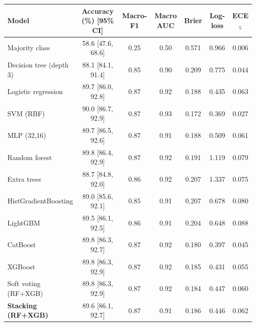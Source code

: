 \begin{tabular}{@{}lcccccc@{}}
\toprule
Model & Accuracy (\%) [95\% CI] & Macro-F1 & Macro AUC & Brier & Log-loss & ECE$_5$\\
\midrule
Majority class & 58.6 [47.6, 68.6] & 0.25 & 0.50 & 0.571 & 0.966 & 0.006\\\midrule
Decision tree (depth 3) & 88.1 [84.1, 91.4] & 0.85 & 0.90 & 0.209 & 0.775 & 0.044\\
Logistic regression & 89.7 [86.0, 92.8] & 0.87 & 0.92 & 0.188 & 0.435 & 0.063\\
SVM (RBF) & 90.0 [86.7, 92.9] & 0.87 & 0.93 & 0.172 & 0.369 & 0.027\\\midrule
MLP (32,16) & 89.7 [86.5, 92.6] & 0.87 & 0.91 & 0.188 & 0.509 & 0.061\\
Random forest & 89.8 [86.4, 92.9] & 0.87 & 0.92 & 0.191 & 1.119 & 0.079\\
Extra trees & 88.7 [84.8, 92.0] & 0.86 & 0.92 & 0.207 & 1.337 & 0.075\\
HistGradientBoosting & 89.0 [85.6, 92.1] & 0.85 & 0.91 & 0.207 & 0.678 & 0.080\\
LightGBM & 89.5 [86.1, 92.5] & 0.86 & 0.91 & 0.204 & 0.648 & 0.088\\
CatBoost & 89.8 [86.3, 92.7] & 0.87 & 0.92 & 0.180 & 0.397 & 0.045\\\midrule
XGBoost & 89.8 [86.3, 92.9] & 0.87 & 0.92 & 0.185 & 0.431 & 0.055\\
Soft voting (RF+XGB) & 89.8 [86.3, 92.9] & 0.87 & 0.92 & 0.184 & 0.447 & 0.060\\
\textbf{Stacking (RF+XGB)} & 89.6 [86.1, 92.7] & 0.87 & 0.91 & 0.186 & 0.446 & 0.062\\
\bottomrule
\end{tabular}
